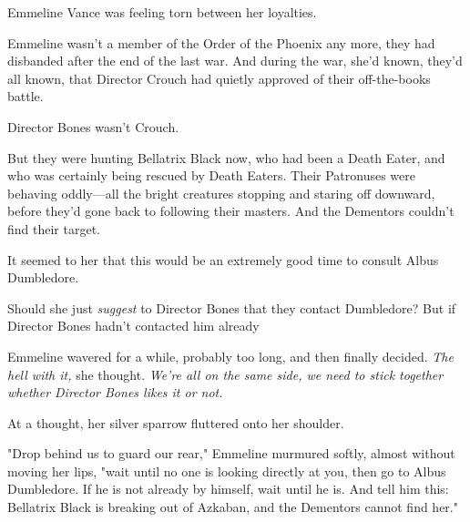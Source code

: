 Emmeline Vance was feeling torn between her loyalties.

Emmeline wasn't a member of the Order of the Phoenix any more, they had
disbanded after the end of the last war. And during the war, she'd known,
they'd all known, that Director Crouch had quietly approved of their
off-the-books battle.

Director Bones wasn't Crouch.

But they were hunting Bellatrix Black now, who had been a Death Eater, and who
was certainly being rescued by Death Eaters. Their Patronuses were behaving
oddly—all the bright creatures stopping and staring off downward, before
they'd gone back to following their masters. And the Dementors couldn't find
their target.

It seemed to her that this would be an extremely good time to consult Albus
Dumbledore.

Should she just \emph{suggest} to Director Bones that they contact Dumbledore?
But if Director Bones hadn't contacted him already{\el}

Emmeline wavered for a while, probably too long, and then finally decided.
\emph{The hell with it,} she thought. \emph{We're all on the same side, we need
to stick together whether Director Bones likes it or not.}

At a thought, her silver sparrow fluttered onto her shoulder.

"Drop behind us to guard our rear," Emmeline murmured softly, almost without
moving her lips, "wait until no one is looking directly at you, then go to
Albus Dumbledore. If he is not already by himself, wait until he is. And tell
him this: Bellatrix Black is breaking out of Azkaban, and the Dementors cannot
find her."
